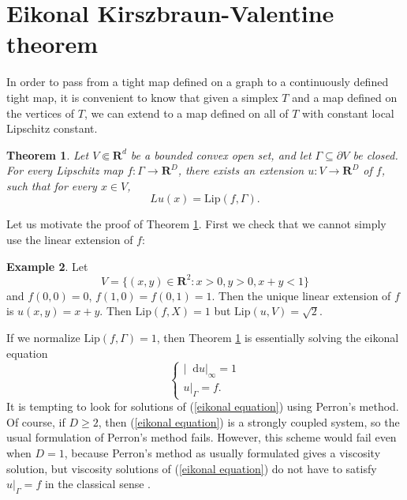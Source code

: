 \documentclass[reqno,11pt]{amsart}
\newcommand{\RR}{\mathbf{R}}
\newcommand*\dif{\mathop{}\!\mathrm{d}}
\newcommand{\Lip}{\mathrm{Lip}}
\newtheorem{theorem}{Theorem}[section]
\theoremstyle{definition}
\newtheorem{example}[theorem]{Example}
\numberwithin{equation}{section}
\begin{document}
\section{Eikonal Kirszbraun-Valentine theorem}
In order to pass from a tight map defined on a graph to a continuously defined tight map, it is convenient to know that given a simplex $T$ and a map defined on the vertices of $T$, we can extend to a map defined on all of $T$ with constant local Lipschitz constant.

\begin{theorem}\label{eikonal extension}
Let $V \Subset \RR^d$ be a bounded convex open set, and let $\Gamma \subseteq \partial V$ be closed.
For every Lipschitz map $f: \Gamma \to \RR^D$, there exists an extension $u: V \to \RR^D$ of $f$, such that for every $x \in V$,
$$Lu(x) = \Lip(f, \Gamma).$$
\end{theorem}

Let us motivate the proof of Theorem \ref{eikonal extension}.
First we check that we cannot simply use the linear extension of $f$:

\begin{example}
Let
$$V = \{(x, y) \in \RR^2: x > 0, y > 0, x + y < 1\}$$
and $f(0, 0) = 0$, $f(1, 0) = f(0, 1) = 1$.
Then the unique linear extension of $f$ is $u(x, y) = x + y$.
Then $\Lip(f, X) = 1$ but $\Lip(u, V) = \sqrt 2$.
\end{example}

If we normalize $\Lip(f, \Gamma) = 1$, then Theorem \ref{eikonal extension} is essentially solving the eikonal equation
\begin{equation}\label{eikonal equation}
\begin{cases}
|\dif u|_\infty = 1 \\
u|_\Gamma = f.
\end{cases}
\end{equation}
It is tempting to look for solutions of (\ref{eikonal equation}) using Perron's method.
Of course, if $D \geq 2$, then (\ref{eikonal equation}) is a strongly coupled system, so the usual formulation of Perron's method \cite{Ishii92} fails.
However, this scheme would fail even when $D = 1$, because Perron's method as usually formulated gives a viscosity solution, but viscosity solutions of (\ref{eikonal equation}) do not have to satisfy $u|_\Gamma = f$ in the classical sense \cite[\S7.C]{Crandall92}.
\end{document}
